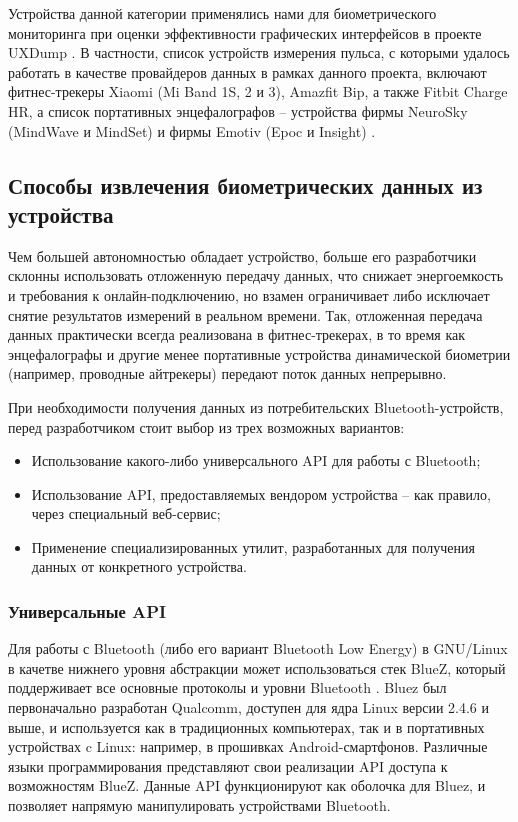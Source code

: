 \documentclass[10pt, a5paper]{article}
\begin{document}
Устройства данной категории применялись нами для биометрического мониторинга при оценки эффективности графических интерфейсов в проекте UXDump \cite{bib1}. В частности, список устройств измерения пульса, с которыми удалось работать в качестве провайдеров данных в рамках данного проекта, включают фитнес-трекеры Xiaomi (Mi Band 1S, 2 и 3), Amazfit Bip, а также Fitbit Charge HR, а список  портативных энцефалографов -- устройства фирмы NeuroSky (MindWave и MindSet) и фирмы Emotiv (Epoc и Insight) \cite{bib2}.

\subsection*{Способы извлечения биометрических данных из устройства}

Чем большей автономностью обладает устройство, больше его разработчики склонны использовать отложенную передачу данных, что снижает энергоемкость и требования к онлайн-подключению, но взамен ограничивает либо исключает снятие результатов измерений в реальном времени. Так, отложенная передача данных практически всегда реализована в фитнес-трекерах, в то время как энцефалографы и другие менее портативные устройства динамической биометрии (например, проводные айтрекеры) передают поток данных непрерывно.

При необходимости получения данных из потребительских \linebreak Bluetooth-устройств, перед разработчиком стоит выбор из трех возможных вариантов:

\begin{itemize}
  \item Использование какого-либо универсального API для работы с Bluetooth;
  \item Использование API, предоставляемых вендором устройства -- как правило, через специальный веб-сервис;
  \item Применение специализированных утилит, разработанных для получения данных от конкретного устройства.
\end{itemize}

\subsubsection*{Универсальные API}

Для работы с Bluetooth (либо его вариант Bluetooth Low Energy) в GNU/Linux в качетве нижнего уровня абстракции может использоваться стек BlueZ, который поддерживает все основные протоколы и уровни Bluetooth \cite{bib3}. Bluez был первоначально разработан Qualcomm, доступен для ядра Linux версии 2.4.6 и выше, и используется как в традиционных компьютерах, так и в портативных устройствах c Linux: например, в прошивках Android-смартфонов. Различные языки программирования представляют свои реализации API доступа к возможностям BlueZ. Данные API функционируют как оболочка для Bluez, и позволяет напрямую манипулировать устройствами Bluetooth.
\end{document}
